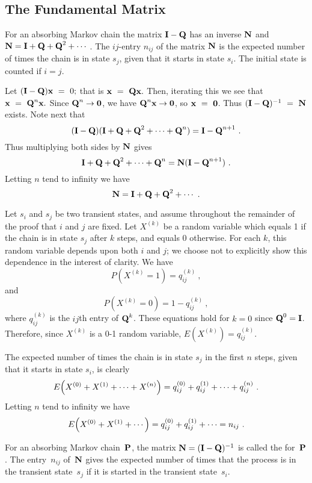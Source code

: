 \subsection*{The Fundamental Matrix}
\begin{theorem}\label{thm 11.2.2}
For an absorbing Markov chain the matrix ${\mbox{\bf I}\/} - {\mbox{\bf Q}\/}$ has an inverse
${\mbox{\bf N}\/}$ and 
$\mat{N}  =\mat{I} + \mat{Q} + \mat{Q}^{2} + \cdots\ $.  The $ij$-entry
$n_{ij}$ of the 
matrix ${\mbox{\bf N}\/}$ is the expected number of times the chain is in state $s_j$,
given that 
it starts in state $s_i$.  The initial state is counted if $i = j$.

\proof  
Let $({\mbox{\bf I}\/} - {\mbox{\bf Q}\/}){\mbox{\bf x}\/}~=~0;$ that is ${\mbox{\bf x}\/}~=~{\mbox{\bf Q}\/}{\mbox{\bf x}\/}.$ Then,
iterating
this we see that 
${\mbox{\bf x}\/}~=~{\mbox{\bf Q}\/}^{n}{\mbox{\bf x}\/}.$    Since ${\mbox{\bf Q}\/}^{n} \rightarrow {\mbox{\bf0}\/}$, we
have
${\mbox{\bf Q}\/}^n{\mbox{\bf x}\/} \rightarrow {\mbox{\bf0}\/}$, so
${\mbox{\bf x}\/}~=~{\mbox{\bf0}\/}$.   Thus $({\mbox{\bf I}\/} - {\mbox{\bf Q}\/})^{-1}~=~{\mbox{\bf N}\/}$ exists.  Note
next that
$$
({\mbox{\bf I}\/} - {\mbox{\bf Q}\/}) ({\mbox{\bf I}\/} + {\mbox{\bf Q}\/} + {\mbox{\bf Q}\/}^2 + \cdots + {\mbox{\bf Q}\/}^n) =
{\mbox{\bf I}\/} -
{\mbox{\bf Q}\/}^{n + 1}\ .
$$
Thus multiplying both sides by ${\mbox{\bf N}\/}$ gives
$$
{\mbox{\bf I}\/} + {\mbox{\bf Q}\/} + {\mbox{\bf Q}\/}^2 + \cdots + {\mbox{\bf Q}\/}^n = {\mbox{\bf N}\/} ({\mbox{\bf I}\/} -
{\mbox{\bf Q}\/}^{n + 1})\ .
$$
Letting $n$ tend to infinity we have 
$$
{\mbox{\bf N}\/} = {\mbox{\bf I}\/} + {\mbox{\bf Q}\/} + {\mbox{\bf Q}\/}^2 + \cdots\ .
$$

Let $s_i$ and $s_j$ be two transient states, and assume throughout the
remainder of the proof
that $i$ and $j$ are fixed.  Let $X^{(k)}$ be a random variable which equals 1
if the chain is in
state $s_j$ after $k$ steps, and equals 0 otherwise.  For each $k$, this random
variable
depends upon both $i$ and $j$; we choose not to explicitly show this dependence
in the
interest of clarity.  We have
$$
P(X^{(k)} = 1) = q_{ij}^{(k)}\ ,
$$
and
$$
P(X^{(k)} = 0) = 1 - q_{ij}^{(k)}\ ,
$$
where $q_{ij}^{(k)}$ is the $ij$th entry of ${\mbox{\bf Q}\/}^k$.  These equations hold
for $k = 0$ since ${\mbox{\bf Q}\/}^0 = {\mbox{\bf I}\/}$.  Therefore, since $X^{(k)}$ is a 0-1
random variable, $E(X^{(k)}) = q_{ij}^{(k)}$.  
\par
The expected number of times the chain is in state $s_j$ in the first $n$
steps, 
given that it starts in state $s_i$, is clearly
$$E\Bigl(X^{(0)} + X^{(1)} + \cdots + X^{(n)} \Bigr) = q_{ij}^{(0)} +
q_{ij}^{(1)} +
\cdots + q_{ij}^{(n)}\ .$$
Letting $n$ tend to infinity we have 
$$
E\Bigl(X^{(0)} + X^{(1)} + \cdots \Bigr) = q_{ij}^{(0)} +
q_{ij}^{(1)} + \cdots  = n_{ij} \ .
$$
\end{theorem}

\begin{definition}
For an absorbing Markov chain~${\mbox{\bf P}\/}$, the matrix ${\mbox{\bf N}\/} = ({\mbox{\bf I}\/} -
{\mbox{\bf Q}\/})^{-1}$ is
called the
 for~${\mbox{\bf P}\/}$.  The entry~$n_{ij}$ of~${\mbox{\bf N}\/}$ gives the
expected number
of times that the process is in the transient state~$s_j$ if it is started in
the transient 
state~$s_i$.
\end{definition}

